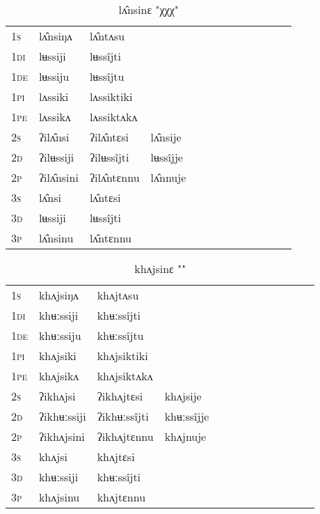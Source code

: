\documentclass[oldfontcommands,oneside,a4paper,11pt]{article}
\begin{document}
\begin{table}[H]
\label{ut.vr} \centering 
\caption{lʌ̂nsinɛ  "χχχ"  }
\begin{tabular}{l|l|l|l|l|l|l|l|l|l|l|l|l}  \toprule
\textsc{1s} &lʌ̂nsiŋʌ &lʌ̂ntʌsu \\ 
\textsc{1di} &lʉssiji &lʉssîjti   \\
\textsc{1de} &lʉssiju &lʉssîjtu   \\ 
\textsc{1pi} &lʌssiki &lʌssiktiki   \\ 
\textsc{1pe} &lʌssikʌ &lʌssiktʌkʌ   \\ 
\textsc{2s} & ʔilʌ̂nsi & ʔilʌ̂ntɛsi &lʌ̂nsije  \\ 
\textsc{2d} & ʔilʉssiji & ʔilʉssîjti &lʉssîjje    \\
\textsc{2p} & ʔilʌ̂nsini  & ʔilʌ̂ntɛnnu &lʌ̂nnuje  \\ 
\textsc{3s} & lʌ̂nsi & lʌ̂ntɛsi   \\ 
\textsc{3d} & lʉssiji & lʉssîjti   \\ 
\textsc{3p} & lʌ̂nsinu  & lʌ̂ntɛnnu \\ 
\bottomrule
\end{tabular}
\end{table}


\begin{table}[H]
\label{un.vr} \centering 
\caption{khʌjsinɛ  ""  }
\begin{tabular}{l|l|l|l|l|l|l|l|l|l|l|l|l}  \toprule
\textsc{1s} &khʌjsiŋʌ &khʌjtʌsu \\ 
\textsc{1di} &khʉːssiji &khʉːssîjti   \\
\textsc{1de} &khʉːssiju &khʉːssîjtu   \\ 
\textsc{1pi} &khʌjsiki &khʌjsiktiki   \\ 
\textsc{1pe} &khʌjsikʌ &khʌjsiktʌkʌ   \\ 
\textsc{2s} & ʔikhʌjsi & ʔikhʌjtɛsi &khʌjsije  \\ 
\textsc{2d} & ʔikhʉːssiji & ʔikhʉːssîjti &khʉːssîjje    \\
\textsc{2p} & ʔikhʌjsini  & ʔikhʌjtɛnnu &khʌjnuje  \\ 
\textsc{3s} & khʌjsi & khʌjtɛsi   \\ 
\textsc{3d} & khʉːssiji & khʉːssîjti   \\ 
\textsc{3p} & khʌjsinu  & khʌjtɛnnu \\ 
\bottomrule
\end{tabular}
\end{table}
\end{document}
